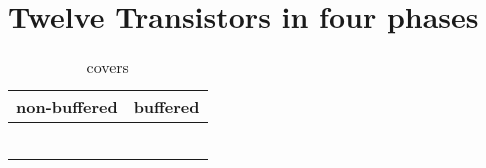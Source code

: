 \section{Twelve Transistors in four phases}

\begin{table}[ht]
\centering
\caption*{covers}

\begin{tabular}{cc}
    \toprule
    non-buffered & buffered \\
    \midrule

    \nameref{cell:AOOAOI2121} & \nameref{cell:AOOAO2121} \\
    \nameref{cell:OAAOAI2121} & \nameref{cell:OAAOA2121} \\
    \nameref{cell:AOAAOI2112} & \nameref{cell:AOAAO2112} \\
    \nameref{cell:OAOOAI2112} & \nameref{cell:OAOOA2112} \\
    \nameref{cell:AAOAOI2211} & \nameref{cell:AAOAO2211} \\
    \nameref{cell:OOAOAI2211} & \nameref{cell:OOAOA2211}

\end{tabular}

\end{table}

 
 
 
 
 
 
